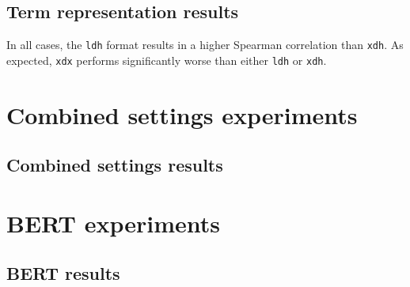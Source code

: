 \subsection{Term representation results}
\label{sec:term-norm-results}
In all cases, the \texttt{ldh} format results in a higher Spearman correlation than \texttt{xdh}. As expected, \texttt{xdx} performs significantly worse than either \texttt{ldh} or \texttt{xdh}.


\section{Combined settings experiments}
\label{sec:exp-combos}
\subsection{Combined settings results}
\label{sec:combos-results}

\section{BERT experiments}
\label{sec:exp-bert}
\subsection{BERT results}
\label{sec:bert-results}

